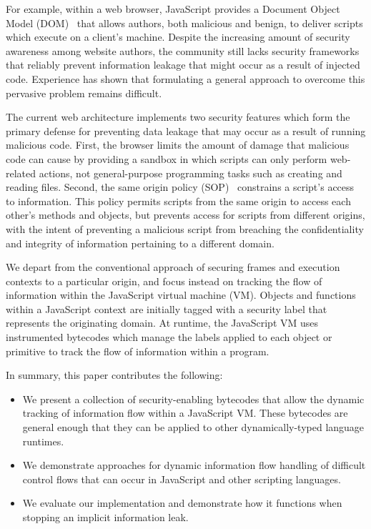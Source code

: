 \documentclass{llncs}
\begin{document}
For example, within a web browser, JavaScript provides a Document Object Model (DOM)~\cite{dom} that allows authors, both malicious and benign, to deliver scripts which execute on a client's machine.
Despite the increasing amount of security awareness among website authors, the community still lacks security frameworks that reliably prevent information leakage that might occur as a result of injected code.
Experience has shown that formulating a general approach to overcome this pervasive problem remains difficult.

The current web architecture implements two security features which form the primary defense for preventing data leakage that may occur as a result of running malicious code.
First, the browser limits the amount of damage that malicious code can cause by providing a sandbox in which scripts can only perform web-related actions, not general-purpose programming tasks such as creating and reading files.
Second, the same origin policy (SOP)~\cite{sop} constrains a script's access to information.
This policy permits scripts from the same origin to access each other's methods and objects, but prevents access for scripts from different origins, with the intent of preventing a malicious script from breaching the confidentiality and integrity of information pertaining to a different domain.

We depart from the conventional approach of securing frames and execution contexts to a particular origin, and focus instead on tracking the flow of information within the JavaScript virtual machine (VM).
Objects and functions within a JavaScript context are initially tagged with a security label that represents the originating domain.
At runtime, the JavaScript VM uses instrumented bytecodes which manage the labels applied to each object or primitive to track the flow of information within a program.

In summary, this paper contributes the following:
\begin{itemize}
\item{We present a collection of security-enabling bytecodes that allow the dynamic tracking of information flow within a JavaScript VM. These bytecodes are general enough that they can be applied to other dynamically-typed language runtimes.}
\item{We demonstrate approaches for dynamic information flow handling of difficult control flows that can occur in JavaScript and other scripting languages.}
\item{We evaluate our implementation and demonstrate how it functions when stopping an implicit information leak.}
\end{itemize}
\end{document}
